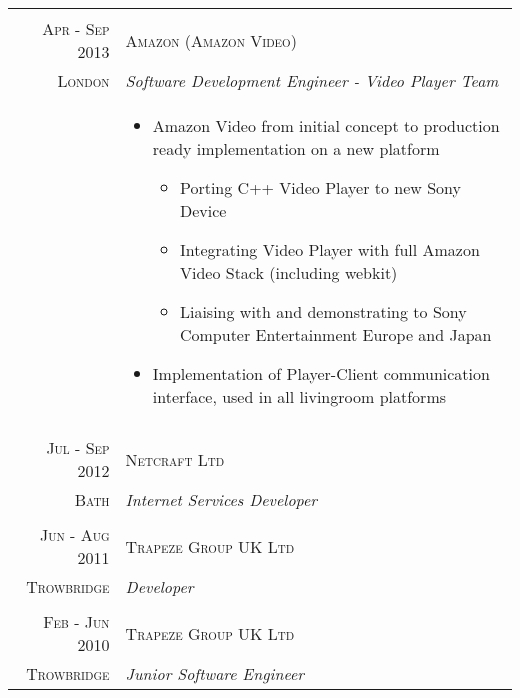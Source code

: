 \begin{tabular}{r|p{11cm}}
\multicolumn{2}{c}{} \\

\textsc{Apr - Sep 2013} & \textsc{Amazon (Amazon Video)}\\
\textsc{London} & \emph{Software Development Engineer - Video Player Team}\\
& \begin{footnotesize}
\begin{itemize}
	\vspace*{-\baselineskip}
	\item Amazon Video from initial concept to production ready implementation on a new platform
		\begin{itemize}
		\item Porting C++ Video Player to new Sony Device
		\item Integrating Video Player with full Amazon Video Stack (including webkit)
		\item Liaising with and demonstrating to Sony Computer Entertainment Europe and Japan
		\end{itemize}
	\item Implementation of Player-Client communication interface, used in all livingroom platforms
	\vspace*{-\baselineskip}
\end{itemize}
\end{footnotesize}\\

\multicolumn{2}{c}{} \\


\textsc{Jul - Sep 2012} & \textsc{Netcraft Ltd}\\ 
\textsc{Bath} & \emph{Internet Services Developer}\\

\multicolumn{2}{c}{} \\


\textsc{Jun - Aug 2011} & \textsc{Trapeze Group UK Ltd}\\ 
\textsc{Trowbridge} & \emph{Developer}\\

\multicolumn{2}{c}{} \\


\textsc{Feb - Jun 2010} & \textsc{Trapeze Group UK Ltd}\\ 
\textsc{Trowbridge} & \emph{Junior Software Engineer}\\

\end{tabular}